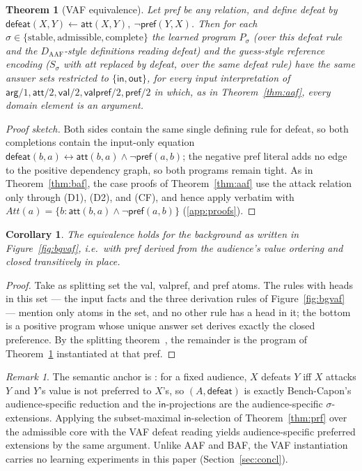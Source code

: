 \documentclass[review,12pt]{elsarticle}
\newtheorem{theorem}{Theorem}
\newtheorem{corollary}{Corollary}
\theoremstyle{definition}
\theoremstyle{remark}
\newtheorem{remark}{Remark}
\newcommand{\pred}[1]{\textsf{#1}}
\newcommand{\Daaf}{D_{\mathrm{AAF}}}
\newcommand{\Att}{\mathit{Att}}
\begin{document}
\begin{theorem}[VAF equivalence]
\label{thm:vaf}
Let \pred{pref} be \emph{any} relation, and define defeat by
$\pred{defeat}(X,Y)\leftarrow\pred{att}(X,Y),\ \neg\pred{pref}(Y,X)$. Then
for each $\sigma\in\{\text{stable},\text{admissible},\text{complete}\}$ the
learned program $P_\sigma$ (over this defeat rule and the $\Daaf$-style
definitions reading \pred{defeat}) and the guess-style reference encoding
($S_\sigma$ with \pred{att} replaced by \pred{defeat}, over the same defeat
rule) have the same answer sets restricted to $\{\pred{in},\pred{out}\}$, for
every input interpretation of
$\pred{arg}/1,\pred{att}/2,\pred{val}/2,\pred{valpref}/2,\pred{pref}/2$ in
which, as in Theorem~\ref{thm:aaf}, every domain element is an argument.
\end{theorem}

\begin{proof}[Proof sketch]
Both sides contain the same single defining rule for \pred{defeat}, so both
completions contain the input-only equation
$\pred{defeat}(b,a)\leftrightarrow
\pred{att}(b,a)\wedge\neg\pred{pref}(a,b)$; the negative \pred{pref} literal
adds no edge to the positive dependency graph, so both programs remain tight.
As in Theorem~\ref{thm:baf}, the case proofs of Theorem~\ref{thm:aaf} use the
attack relation only through (D1), (D2), and (CF), and hence apply verbatim
with $\Att(a)=\{b:\pred{att}(b,a)\wedge\neg\pred{pref}(a,b)\}$
(\ref{app:proofs}).
\end{proof}

\begin{corollary}
\label{cor:vafclosure}
The equivalence holds for the background as written in
Figure~\ref{fig:bgvaf}, i.e.\ with \pred{pref} derived from the audience's
value ordering and closed transitively in place.
\end{corollary}

\begin{proof}
Take as splitting set the \pred{val}, \pred{valpref}, and \pred{pref} atoms.
The rules with heads in this set --- the input facts and the three derivation
rules of Figure~\ref{fig:bgvaf} --- mention only atoms in the set, and no
other rule has a head in it; the bottom is a positive program whose unique
answer set derives exactly the closed preference. By the splitting
theorem~\citep{lifschitz1994}, the remainder is the program of
Theorem~\ref{thm:vaf} instantiated at that \pred{pref}.
\end{proof}

\begin{remark}
The semantic anchor is \citet{benchcapon2003}: for a fixed audience, $X$
defeats $Y$ iff $X$ attacks $Y$ and $Y$'s value is not preferred to $X$'s, so
$(A,\pred{defeat})$ is exactly Bench-Capon's audience-specific reduction and
the $\pred{in}$-projections are the audience-specific $\sigma$-extensions.
Applying the subset-maximal $\pred{in}$-selection of Theorem~\ref{thm:prf}
over the admissible core with the VAF defeat reading yields audience-specific
preferred extensions by the same argument. Unlike AAF and BAF, the VAF
instantiation carries no learning experiments in this paper
(Section~\ref{sec:concl}).
\end{remark}
\end{document}
